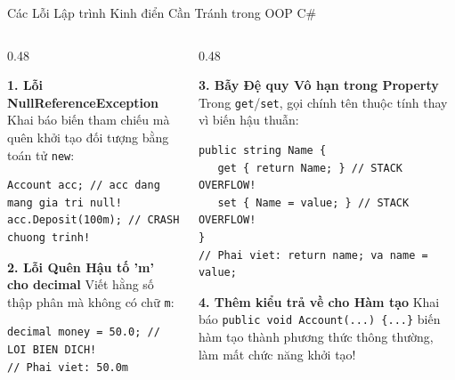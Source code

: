 \documentclass[aspectratio=169, 10pt]{beamer}
\begin{document}
\begin{frame}[fragile]{Các Lỗi Lập trình Kinh điển Cần Tránh trong OOP C\#}
  \begin{columns}[T]
    \begin{column}{0.48\textwidth}
      \begin{alertblock}{\textbf{1. Lỗi NullReferenceException}}
        \small Khai báo biến tham chiếu mà quên khởi tạo đối tượng bằng toán tử \texttt{new}:
        \begin{lstlisting}[numbers=none]
Account acc; // acc dang mang gia tri null!
acc.Deposit(100m); // CRASH chuong trinh!
        \end{lstlisting}
      \end{alertblock}
      \begin{alertblock}{\textbf{2. Lỗi Quên Hậu tố 'm' cho decimal}}
        \small Viết hằng số thập phân mà không có chữ \texttt{m}:
        \begin{lstlisting}[numbers=none]
decimal money = 50.0; // LOI BIEN DICH!
// Phai viet: 50.0m
        \end{lstlisting}
      \end{alertblock}
    \end{column}

    \begin{column}{0.48\textwidth}
      \begin{alertblock}{\textbf{3. Bẫy Đệ quy Vô hạn trong Property}}
        \small Trong \texttt{get}/\texttt{set}, gọi chính tên thuộc tính thay vì biến hậu thuẫn:
        \begin{lstlisting}[numbers=none]
public string Name {
   get { return Name; } // STACK OVERFLOW!
   set { Name = value; } // STACK OVERFLOW!
}
// Phai viet: return name; va name = value;
        \end{lstlisting}
      \end{alertblock}
      \begin{alertblock}{\textbf{4. Thêm kiểu trả về cho Hàm tạo}}
        \small Khai báo \texttt{public void Account(...) \{...\}} biến hàm tạo thành phương thức thông thường, làm mất chức năng khởi tạo!
      \end{alertblock}
    \end{column}
  \end{columns}
\end{frame}
\end{document}
